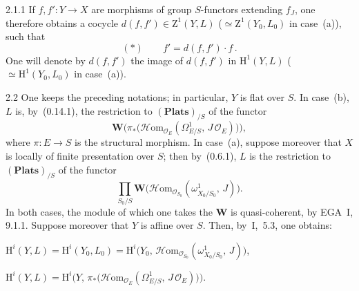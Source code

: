 \begin{remark}{2.1.1}
\label{III.2.1.1}
{\renewcommand{\thefootnote}{(54)}}
If \(f,f'\colon Y\to X\) are morphisms of group \(S\)-functors extending
\(f_{J}\), one therefore obtains a cocycle
\(d(f,f')\in\mathrm{Z}^{1}(Y,L)\)
(\(\simeq\mathrm{Z}^{1}(Y_{0},L_{0})\) in case~(a)), such that
\[
(*)\qquad f'=d(f,f')\cdot f\,.
\]%
{\renewcommand{\thefootnote}{(55)}}
One will denote by \(d(f,f')\) the image of \(d(f,f')\) in
\(\mathrm{H}^{1}(Y,L)\)
(\(\simeq\mathrm{H}^{1}(Y_{0},L_{0})\) in case~(a)).
\end{remark}

\begin{remark}{2.2}
\label{III.2.2}
One keeps the preceding notations; in particular, \(Y\) is flat over \(S\).
In case~(b), \(L\) is, by~(0.14.1), the restriction to
\((\mathbf{Plats})_{/S}\) of the functor
\[
\mathbf{W}\bigl(
  \pi_{*}\bigl(\mathcal{H}\mathrm{om}_{\mathcal{O}_{E}}
    (\Omega^{1}_{E/S},\, J\,\mathcal{O}_{E})\bigr)
\bigr),
\]
where \(\pi\colon E\to S\) is the structural morphism. In case~(a), suppose
moreover that \(X\) is locally of finite presentation over \(S\); then
by~(0.6.1), \(L\) is the restriction to \((\mathbf{Plats})_{/S}\) of the
functor
\[
\prod_{S_{0}/S}
\mathbf{W}\bigl(
  \mathcal{H}\mathrm{om}_{\mathcal{O}_{S_{0}}}
    (\omega^{1}_{X_{0}/S_{0}},\, J)
\bigr).
\]
In both cases, the module of which one takes the \(\mathbf{W}\) is
quasi-coherent, by EGA~I, 9.1.1. Suppose moreover that \(Y\) is affine over
\(S\){\renewcommand{\thefootnote}{(56)}}.
Then, by~I,~5.3, one obtains:
\begin{enumeratea}
\item \(\mathrm{H}^{i}(Y,L)=\mathrm{H}^{i}(Y_{0},L_{0})
=\mathrm{H}^{i}\bigl(Y_{0},\,
\mathcal{H}\mathrm{om}_{\mathcal{O}_{S_{0}}}
(\omega^{1}_{X_{0}/S_{0}},\, J)\bigr)\),
\item \(\mathrm{H}^{i}(Y,L)
=\mathrm{H}^{i}\bigl(Y,\,
\pi_{*}\bigl(\mathcal{H}\mathrm{om}_{\mathcal{O}_{E}}
(\Omega^{1}_{E/S},\, J\,\mathcal{O}_{E})\bigr)\bigr)\).
\end{enumeratea}
\end{remark}


